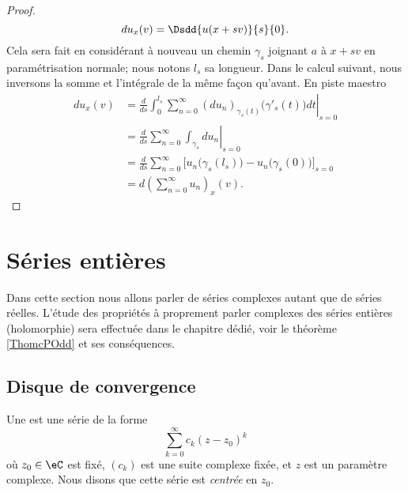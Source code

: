 \begin{proof}
\begin{equation}
        du_x(v)=\Dsdd{ u(x+sv) }{s}{0}.
    \end{equation}
    Cela sera fait en considérant à nouveau un chemin \( \gamma_s \) joignant \( a\) à \( x+sv\) en paramétrisation normale; nous notons \( l_s\) sa longueur. Dans le calcul suivant, nous inversons la somme et l'intégrale de la même façon qu'avant. En piste maestro
    \begin{subequations}
        \begin{align}
            du_x(v)&=\frac{ d  }{ d s }\left.\int_0^{l_s}\sum_{n=0}^{\infty}(du_n)_{\gamma_s(t)}\big( \gamma'_s(t) \big)dt\right|_{s=0}\\
            &=\frac{ d  }{ d s }\left.\sum_{n=0}^{\infty}\int_{\gamma_s}du_n\right|_{s=0}\\
            &=\frac{ d  }{ d s }\sum_{n=0}^{\infty}\Big[ u_n\big( \gamma_s(l_s)\big)-u_n\big( \gamma_s(0) \big)  \Big]_{s=0}\\
            &=d\left( \sum_{n=0}^{\infty}u_n \right)_x(v).
        \end{align}
    \end{subequations}
\end{proof}

\section{Séries entières}

Dans cette section nous allons parler de séries complexes autant que de séries réelles. L'étude des propriétés à proprement parler complexes des séries entières (holomorphie) sera effectuée dans le chapitre dédié, voir le théorème \ref{ThomcPOdd} et ses conséquences.

\subsection{Disque de convergence}

Une  est une série de la forme
\begin{equation}		\label{eqseriepuissance}
	\sum_{k=0}^{\infty}c_k(z-z_0)^k
\end{equation}
où $z_0\in \eC$ est fixé, $(c_k)$ est une suite complexe fixée, et $z$ est un paramètre complexe. Nous disons que cette série est \emph{centrée} en $z_0$.

